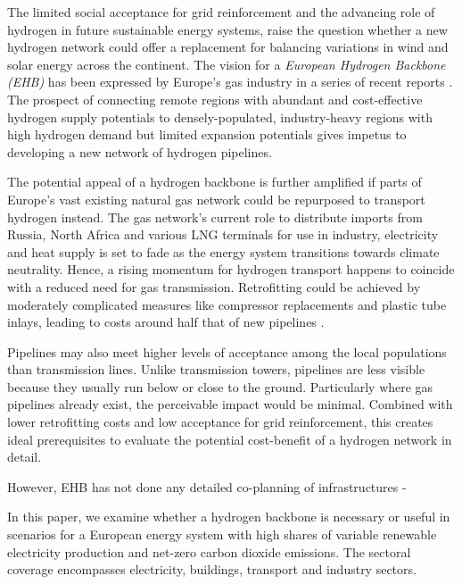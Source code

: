 The limited social acceptance for grid reinforcement and the advancing role of
hydrogen in future sustainable energy systems, raise the question whether a new
hydrogen network could offer a replacement for balancing variations in wind and
solar energy across the continent. The vision for a \textit{European Hydrogen
Backbone (EHB)} has been expressed by Europe's gas industry in a series of
recent reports
\cite{gasforclimateEuropeanHydrogen2020,gasforclimateEuropeanHydrogen2021,gasforclimateExtendingEuropean2021,gasforclimateEuropeanHydrogen2022}.
The prospect of connecting remote regions with abundant and cost-effective
hydrogen supply potentials to densely-populated, industry-heavy regions with
high hydrogen demand but limited expansion potentials gives impetus to
developing a new network of hydrogen pipelines.

The potential appeal of a hydrogen backbone is further amplified if parts of
Europe's vast existing natural gas network could be repurposed to transport
hydrogen instead. The gas network's current role to distribute imports from
Russia, North Africa and various LNG terminals for use in industry, electricity
and heat supply is set to fade as the energy system transitions towards climate
neutrality. Hence, a rising momentum for hydrogen transport happens to coincide
with a reduced need for gas transmission. Retrofitting could be achieved by
moderately complicated measures like compressor replacements and plastic tube
inlays, leading to costs around half that of new pipelines \cite{}.

Pipelines may also meet higher levels of acceptance among the local populations
than transmission lines. Unlike transmission towers, pipelines are less visible
because they usually run below or close to the ground. Particularly where gas
pipelines already exist, the perceivable impact would be minimal. Combined with
lower retrofitting costs and low acceptance for grid reinforcement, this creates
ideal prerequisites to evaluate the potential cost-benefit of a hydrogen network
in detail.


However, EHB has not done any detailed co-planning of infrastructures
-


In this paper, we examine whether a hydrogen backbone is necessary or useful in
scenarios for a European energy system with high shares of variable renewable
electricity production and net-zero carbon dioxide emissions. The sectoral
coverage encompasses electricity, buildings, transport and industry sectors.

